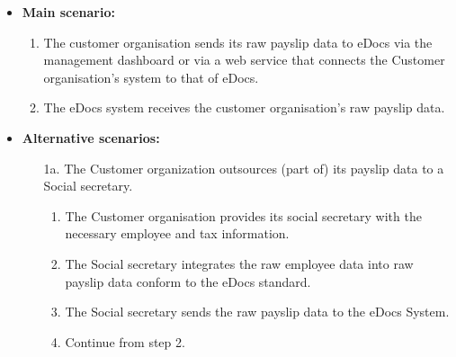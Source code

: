 \documentclass[a4paper,10pt]{article}
\begin{document}
\begin{itemize}
    \item \textbf{Main scenario:} 
    \begin{enumerate}
       \item The customer organisation sends its raw payslip data to eDocs via the management dashboard or via a web service that connects the Customer organisation's system to that of eDocs.
       \item The eDocs system receives the customer organisation's raw payslip data.
    \end{enumerate}
    \item \textbf{Alternative scenarios:} 
    \begin{enumerate}
        \item [1a.] The Customer organization outsources (part of) its payslip data to a Social secretary.
        \begin{enumerate}
        \item The Customer organisation provides its social secretary with the necessary employee and tax information.
        \item  The Social secretary integrates the raw employee data into raw payslip data conform to the eDocs standard.
        \item The Social secretary sends the raw payslip data to the eDocs System.
        \item  Continue from step 2.
        \end{enumerate}
    \end{enumerate}
\end{itemize}
\end{document}
